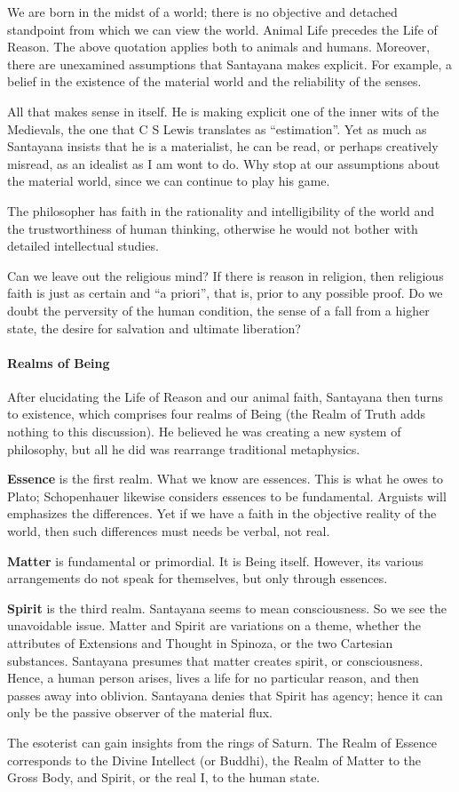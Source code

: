 We are born in the midst of a world; there is no objective and detached standpoint from which we can view the world. Animal Life precedes the Life of Reason. The above quotation applies both to animals and humans. Moreover, there are unexamined assumptions that Santayana makes explicit. For example, a belief in the existence of the material world and the reliability of the senses.

All that makes sense in itself. He is making explicit one of the inner wits of the Medievals, the one that C S Lewis translates as ``estimation''. Yet as much as Santayana insists that he is a materialist, he can be read, or perhaps creatively misread, as an idealist as I am wont to do. Why stop at our assumptions about the material world, since we can continue to play his game.

The philosopher has faith in the rationality and intelligibility of the world and the trustworthiness of human thinking, otherwise he would not bother with detailed intellectual studies.

Can we leave out the religious mind? If there is reason in religion, then religious faith is just as certain and ``a priori'', that is, prior to any possible proof. Do we doubt the perversity of the human condition, the sense of a fall from a higher state, the desire for salvation and ultimate liberation?

\paragraph{Realms of Being}


After elucidating the Life of Reason and our animal faith, Santayana then turns to existence, which comprises four realms of Being (the Realm of Truth adds nothing to this discussion). He believed he was creating a new system of philosophy, but all he did was rearrange traditional metaphysics.

\textbf{Essence} is the first realm. What we know are essences. This is what he owes to Plato; Schopenhauer likewise considers essences to be fundamental. Arguists will emphasizes the differences. Yet if we have a faith in the objective reality of the world, then such differences must needs be verbal, not real.

\textbf{Matter} is fundamental or primordial. It is Being itself. However, its various arrangements do not speak for themselves, but only through essences.

\textbf{Spirit} is the third realm. Santayana seems to mean consciousness. So we see the unavoidable issue. Matter and Spirit are variations on a theme, whether the attributes of Extensions and Thought in Spinoza, or the two Cartesian substances. Santayana presumes that matter creates spirit, or consciousness. Hence, a human person arises, lives a life for no particular reason, and then passes away into oblivion. Santayana denies that Spirit has agency; hence it can only be the passive observer of the material flux.

The esoterist can gain insights from the rings of Saturn. The Realm of Essence corresponds to the Divine Intellect (or Buddhi), the Realm of Matter to the Gross Body, and Spirit, or the real I, to the human state.



